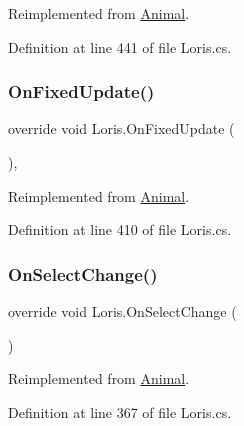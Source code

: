 Reimplemented from \mbox{\hyperlink{class_animal_a86612d846fcd1fcf08f7b89586aa11b7}{Animal}}.



Definition at line 441 of file Loris.\+cs.

\mbox{\label{class_loris_a2a3cedda95b895253c1ae39844680351}} 
\subsubsection{\texorpdfstring{On\+Fixed\+Update()}{OnFixedUpdate()}}
{\footnotesize\ttfamily override void Loris.\+On\+Fixed\+Update (\begin{DoxyParamCaption}{ }\end{DoxyParamCaption})\hspace{0.3cm}{\ttfamily [protected]}, {\ttfamily [virtual]}}



Reimplemented from \mbox{\hyperlink{class_animal_aebce764681f2a949d72b80766beb0752}{Animal}}.



Definition at line 410 of file Loris.\+cs.

\mbox{\label{class_loris_a9da05849af0ab3b5ff8ac6e47f83a8f9}} 
\subsubsection{\texorpdfstring{On\+Select\+Change()}{OnSelectChange()}}
{\footnotesize\ttfamily override void Loris.\+On\+Select\+Change (\begin{DoxyParamCaption}{ }\end{DoxyParamCaption})\hspace{0.3cm}{\ttfamily [virtual]}}



Reimplemented from \mbox{\hyperlink{class_animal_a10f83b51d56e077b400cf6b81b8f9aed}{Animal}}.



Definition at line 367 of file Loris.\+cs.

\mbox{\label{class_loris_a398638e87e93178426ab5a0486a564f7}} 
